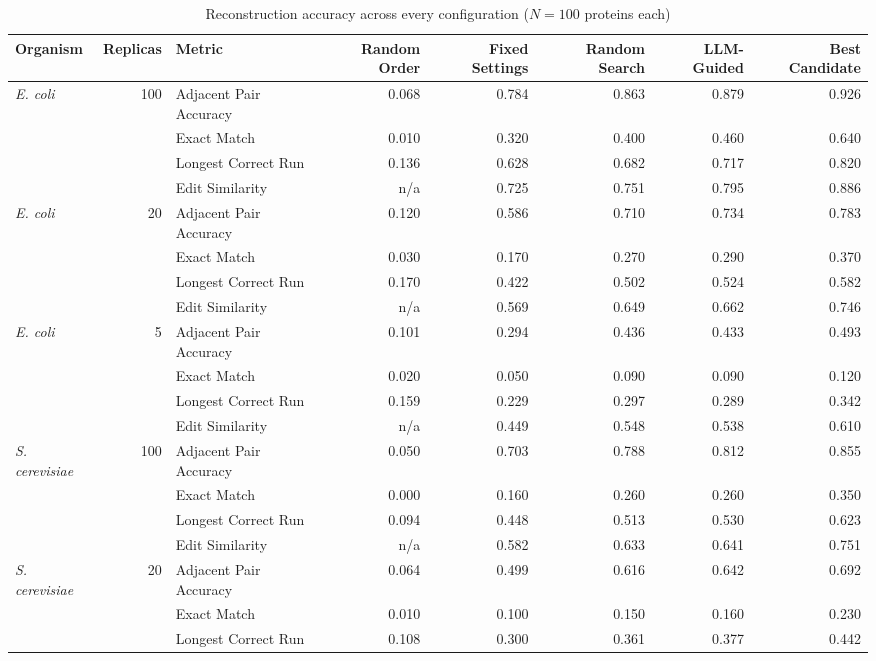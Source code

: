 \begin{table}[!tb]
  \centering
  \caption{Reconstruction accuracy across every configuration ($N=100$ proteins each)}
  \label{tab:main_results_all}
  \begin{tabular}{lrlrrrrr}
    \toprule
    Organism & Replicas & Metric & Random Order & Fixed Settings & Random Search & LLM-Guided & Best Candidate \\
    \midrule
    \textit{E. coli} & 100 & Adjacent Pair Accuracy & 0.068 & 0.784 & 0.863 & 0.879 & 0.926 \\
     &  & Exact Match & 0.010 & 0.320 & 0.400 & 0.460 & 0.640 \\
     &  & Longest Correct Run & 0.136 & 0.628 & 0.682 & 0.717 & 0.820 \\
     &  & Edit Similarity & n/a & 0.725 & 0.751 & 0.795 & 0.886 \\
    \midrule
    \textit{E. coli} & 20 & Adjacent Pair Accuracy & 0.120 & 0.586 & 0.710 & 0.734 & 0.783 \\
     &  & Exact Match & 0.030 & 0.170 & 0.270 & 0.290 & 0.370 \\
     &  & Longest Correct Run & 0.170 & 0.422 & 0.502 & 0.524 & 0.582 \\
     &  & Edit Similarity & n/a & 0.569 & 0.649 & 0.662 & 0.746 \\
    \midrule
    \textit{E. coli} & 5 & Adjacent Pair Accuracy & 0.101 & 0.294 & 0.436 & 0.433 & 0.493 \\
     &  & Exact Match & 0.020 & 0.050 & 0.090 & 0.090 & 0.120 \\
     &  & Longest Correct Run & 0.159 & 0.229 & 0.297 & 0.289 & 0.342 \\
     &  & Edit Similarity & n/a & 0.449 & 0.548 & 0.538 & 0.610 \\
    \midrule
    \textit{S. cerevisiae} & 100 & Adjacent Pair Accuracy & 0.050 & 0.703 & 0.788 & 0.812 & 0.855 \\
     &  & Exact Match & 0.000 & 0.160 & 0.260 & 0.260 & 0.350 \\
     &  & Longest Correct Run & 0.094 & 0.448 & 0.513 & 0.530 & 0.623 \\
     &  & Edit Similarity & n/a & 0.582 & 0.633 & 0.641 & 0.751 \\
    \midrule
    \textit{S. cerevisiae} & 20 & Adjacent Pair Accuracy & 0.064 & 0.499 & 0.616 & 0.642 & 0.692 \\
     &  & Exact Match & 0.010 & 0.100 & 0.150 & 0.160 & 0.230 \\
     &  & Longest Correct Run & 0.108 & 0.300 & 0.361 & 0.377 & 0.442 \\

\end{tabular}
\end{table}
